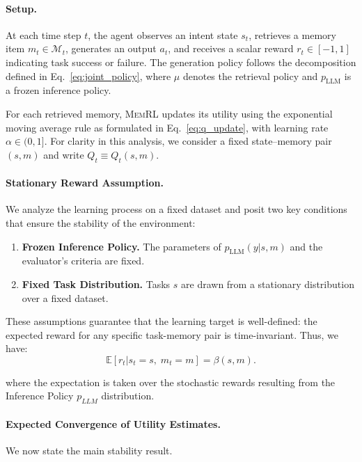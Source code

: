 \documentclass{article}
\theoremstyle{plain}
\theoremstyle{definition}
\theoremstyle{remark}
\begin{document}
\paragraph{Setup.}
At each time step $t$, the agent observes an intent state $s_t$, retrieves a memory item $m_t \in \mathcal{M}_t$, generates an output $a_t$, and receives a scalar reward $r_t \in [-1,1]$ indicating task success or failure. The generation policy follows the decomposition defined in Eq.~\ref{eq:joint_policy}, where $\mu$ denotes the retrieval policy and $p_{\mathrm{LLM}}$ is a frozen inference policy.

For each retrieved memory, \textsc{MemRL} updates its utility using the exponential moving average rule as formulated in Eq.~\ref{eq:q_update}, with learning rate $\alpha \in (0,1]$. For clarity in this analysis, we consider a fixed state--memory pair $(s,m)$ and write $Q_t \equiv Q_t(s,m)$.

\paragraph{Stationary Reward Assumption.}
We analyze the learning process on a fixed dataset and posit two key conditions that ensure the stability of the environment:
\begin{enumerate}
    \item \textbf{Frozen Inference Policy.} The parameters of $p_{\mathrm{LLM}}(y | s,m)$ and the evaluator's criteria are fixed.
    \item \textbf{Fixed Task Distribution.} Tasks $s$ are drawn from a stationary distribution over a fixed dataset.
\end{enumerate}
These assumptions guarantee that the learning target is well-defined: the expected reward for any specific task-memory pair is time-invariant. Thus, we have:
\begin{equation}
\mathbb{E}[r_t | s_t = s,\; m_t = m] = \beta(s,m).
\label{eq:stationary_reward}
\end{equation}

where the expectation is taken over the stochastic rewards resulting from the Inference Policy $p_{LLM}$ distribution.

\paragraph{Expected Convergence of Utility Estimates.}
We now state the main stability result.
\end{document}
